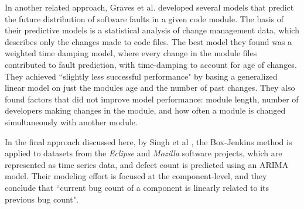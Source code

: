 \documentclass[a4paper]{scrartcl}
\begin{document}
In another related approach, Graves et al.\cite{2000_graves_predicting} developed several models that predict the future distribution of software faults in a given code module. The basis of their predictive models is a statistical analysis of change management data, which describes only the changes made to code files. The best model they found was a weighted time damping model, where every change in the module files contributed to fault prediction, with time-damping to account for age of changes. They achieved ``slightly less successful performance" by basing a generalized linear model on just the modules age and the number of past changes. They also found factors that did not improve model performance: module length, number of developers making changes in the module, and how often a module is changed simultaneously with another module.

In the final approach discussed here, by Singh et al \cite{2010_singh_predicting}, the Box-Jenkins method is applied to datasets from the \textit{Eclipse} and \textit{Mozilla} software projects, which are represented as time series data, and defect count is predicted using an ARIMA model. Their modeling effort is focused at the component-level, and they conclude that ``current bug count of a component is linearly related to its previous bug count".
\end{document}

